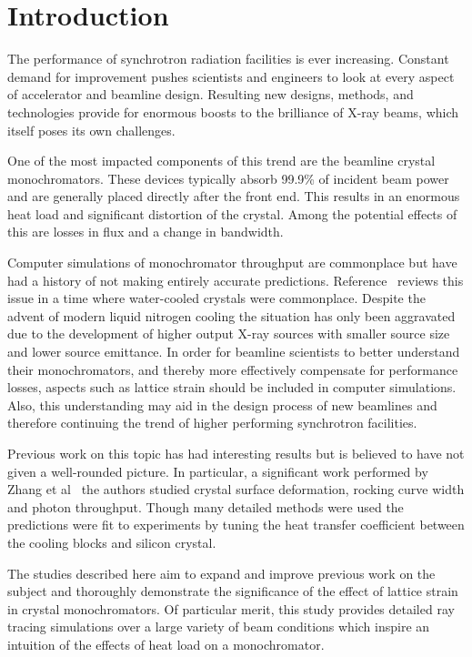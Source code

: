 \documentclass[preprint]{iucr}              %
\begin{document}
\section{Introduction}

The performance of synchrotron radiation facilities is ever increasing. Constant demand for improvement pushes scientists and engineers to look at every aspect of accelerator and beamline design. Resulting new designs, methods, and technologies provide for enormous boosts to the brilliance of X-ray beams, which itself poses its own challenges.

One of the most impacted components of this trend are the beamline crystal monochromators. These devices typically absorb 99.9\% of incident beam power~\cite{willmott} and are generally placed directly after the front end. This results in an enormous heat load and significant distortion of the crystal. Among the potential effects of this are losses in flux and a change in bandwidth.

Computer simulations of monochromator throughput are commonplace but have had a history of not making entirely accurate predictions. Reference~\cite{innacuratepredictions} reviews this issue in a time where water-cooled crystals were commonplace. Despite the advent of modern liquid nitrogen cooling the situation has only been aggravated due to the development of higher output X-ray sources with smaller source size and lower source emittance. In order for beamline scientists to better understand their monochromators, and thereby more effectively compensate for performance losses, aspects such as lattice strain should be included in computer simulations. Also, this understanding may aid in the design process of new beamlines and therefore continuing the trend of higher performing synchrotron facilities.

Previous work on this topic has had interesting results but is believed to have not given a well-rounded picture. In particular, a significant work performed by Zhang et al~\cite{Zhang} the authors studied crystal surface deformation, rocking curve width and photon throughput. Though many detailed methods were used the predictions were fit to experiments by tuning the heat transfer coefficient between the cooling blocks and silicon crystal.

The studies described here aim to expand and improve previous work on the subject and thoroughly demonstrate the significance of the effect of lattice strain in crystal monochromators. Of particular merit, this study provides detailed ray tracing simulations over a large variety of beam conditions which inspire an intuition of the effects of heat load on a monochromator.
\end{document}

